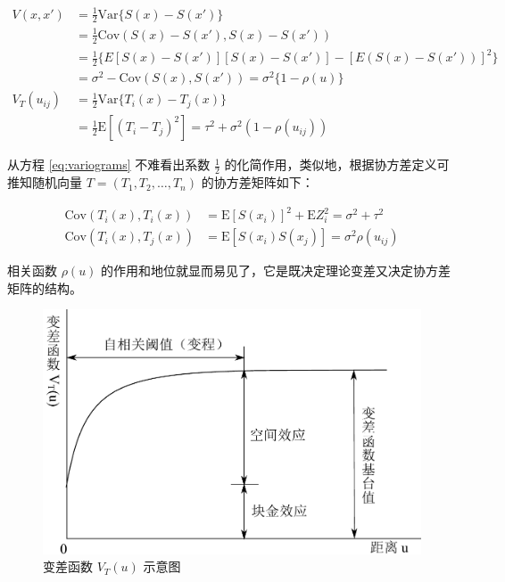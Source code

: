 \documentclass[12pt,a4paper,UTF8,twoside]{book}
\theoremstyle{definition}
\theoremstyle{definition}
\theoremstyle{definition}
\theoremstyle{remark}
\begin{document}
\begin{equation}
\begin{aligned}
V(x,x') 
&= \frac{1}{2}\mathrm{Var}\{S(x)-S(x')\}\\
&= \frac{1}{2}\mathrm{Cov}(S(x)-S(x'),S(x)-S(x'))\\
&= \frac{1}{2}\{E[S(x)-S(x')][S(x)-S(x')]-[E(S(x)-S(x'))]^2\}\\
&= \sigma^2-\mathrm{Cov}(S(x),S(x'))=\sigma^2\{1-\rho(u)\}\\
V_{T}(u_{ij})
&= \frac{1}{2}\mathrm{Var}\{T_{i}(x)-T_{j}(x)\} \\
&= \frac{1}{2}\mathrm{E}[(T_{i}-T_{j})^2]=\tau^2+\sigma^2(1-\rho(u_{ij})) 
\end{aligned} \label{eq:variograms}
\end{equation}

\noindent 从方程 \eqref{eq:variograms} 不难看出系数 \(\frac{1}{2}\)
的化简作用，类似地，根据协方差定义可推知随机向量
\(T = (T_1,T_2,\ldots,T_n)\) 的协方差矩阵如下：

\begin{equation}
\begin{aligned}
\mathrm{Cov}(T_{i}(x),T_{i}(x)) &= \mathrm{E}[S(x_i)]^2 + \mathrm{E}Z_{i}^{2}= \sigma^2+\tau^2 \\
\mathrm{Cov}(T_{i}(x),T_{j}(x)) &= \mathrm{E}[S(x_i)S(x_j)]  = \sigma^2\rho(u_{ij})
\end{aligned}
\end{equation}

\noindent 相关函数 \(\rho(u)\)
的作用和地位就显而易见了，它是既决定理论变差又决定协方差矩阵的结构。

\begin{figure}

{\centering \includegraphics[width=0.7\linewidth]{figures/semi-variance} 

}

\caption{变差函数 $V_{T}(u)$ 示意图}\label{fig:semi-variance}
\end{figure}
\end{document}

